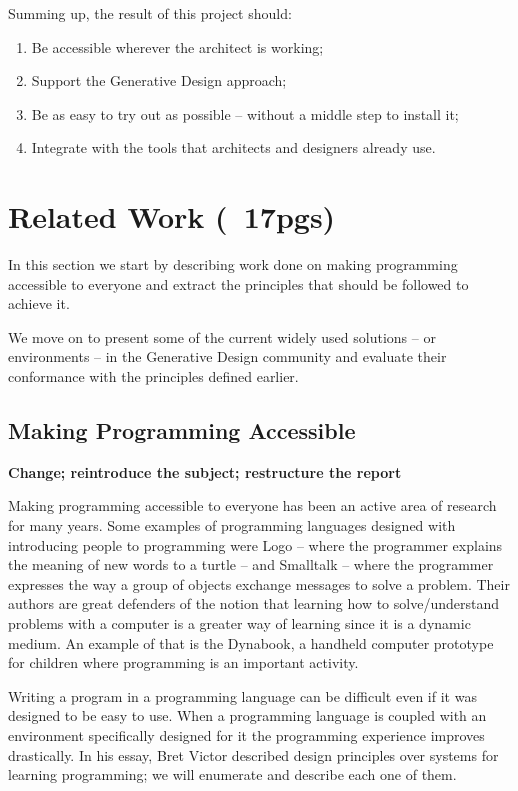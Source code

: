 \documentclass{./llncs2e/llncs}
\begin{document}
	Summing up, the result of this project should:
	\begin{enumerate}
		\item Be accessible wherever the architect is working; \label{obj:access}
		\item Support the Generative Design approach; \label{obj:gen-design}
		\item Be as easy to try out as possible -- without a middle step to install it; \label{obj:no-install}
		\item Integrate with the tools that architects and designers already use.\label{obj:inter-op}
	\end{enumerate}


\section{Related Work (~17pgs)}
	In this section we start by describing work done on making programming accessible to everyone and extract the principles that should be followed to achieve it.

	We move on to present some of the current widely used solutions -- or environments -- in the Generative Design community and evaluate their conformance with the principles defined earlier.

\subsection{Making Programming Accessible}
	\textbf{Change; reintroduce the subject; restructure the report}

	Making programming accessible to everyone has been an active area of research for many years. Some examples of programming languages designed with introducing people to programming were Logo\cite{papert1999logo} -- where the programmer explains the meaning of new words to a turtle -- and Smalltalk\cite{goldberg1983smalltalk} -- where the programmer expresses the way a group of objects exchange messages to solve a problem. Their authors are great defenders of the notion that learning how to solve/understand problems with a computer is a greater way of learning since it is a dynamic medium. An example of that is the Dynabook\cite{Kay:2011:PCC:800193.1971922}, a handheld computer prototype for children where programming is an important activity.

	Writing a program in a programming language can be difficult even if it was designed to be easy to use. When a programming language is coupled with an environment specifically designed for it the programming experience improves drastically. In his essay\cite{victor2012learnable}, Bret Victor described design principles over systems for learning programming; we will enumerate and describe each one of them.
\end{document}
